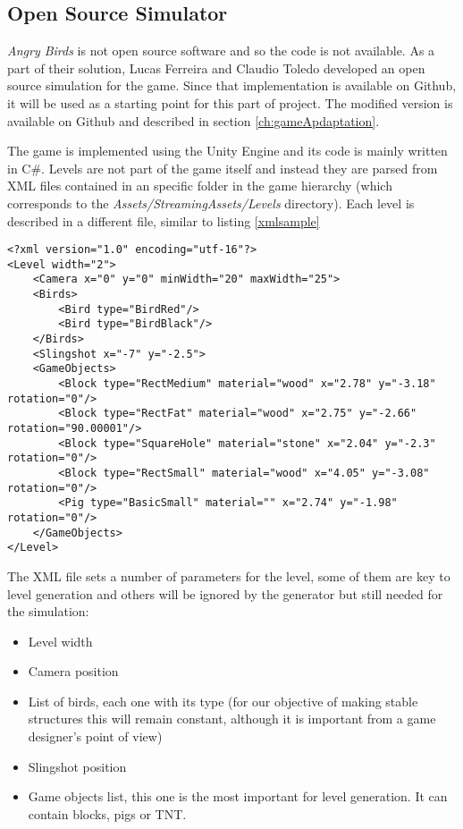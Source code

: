 

\subsection{Open Source Simulator}
\textit{Angry Birds} is not open source software and so the code is not available. As a part of their solution, Lucas Ferreira and Claudio Toledo\cite{ferreira2014search} developed an open source simulation for the game. Since that implementation is available on Github\cite{sciencebirds}, it will be used as a starting point for this part of project. The modified version is available on Github\cite{sciencebirds-adapt} and described in section \ref{ch:gameApdaptation}.

The game is implemented using the Unity Engine and its code is mainly written in C\#. Levels are not part of the game itself and instead they are parsed from XML files contained in an specific folder in the game hierarchy (which corresponds to the \textit{Assets/StreamingAssets/Levels} directory). Each level is described in a different file, similar to listing \ref{xmlsample}

\bigskip

\lstset{language=XML}
\begin{lstlisting}[caption=Sample level input to show format, label=xmlsample]
<?xml version="1.0" encoding="utf-16"?>
<Level width="2">
	<Camera x="0" y="0" minWidth="20" maxWidth="25">
	<Birds>
		<Bird type="BirdRed"/>
		<Bird type="BirdBlack"/>
	</Birds>
	<Slingshot x="-7" y="-2.5">
	<GameObjects>
		<Block type="RectMedium" material="wood" x="2.78" y="-3.18" rotation="0"/>
		<Block type="RectFat" material="wood" x="2.75" y="-2.66" rotation="90.00001"/>
		<Block type="SquareHole" material="stone" x="2.04" y="-2.3" rotation="0"/>
		<Block type="RectSmall" material="wood" x="4.05" y="-3.08" rotation="0"/>
		<Pig type="BasicSmall" material="" x="2.74" y="-1.98" rotation="0"/>
	</GameObjects>
</Level>
\end{lstlisting}
The XML file sets a number of parameters for the level, some of them are key to level generation and others will be ignored by the generator but still needed for the simulation:
\begin{itemize}
	\item Level width 
	\item Camera position
	\item List of birds, each one with its type (for our objective of making stable structures this will remain constant, although it is important from a game designer's point of view)
	\item Slingshot position
	\item Game objects list, this one is the most important for level generation. It can contain blocks, pigs or TNT.
\end{itemize}

